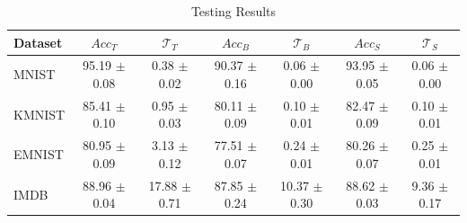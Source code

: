 \begin{table}
	\centering
	\caption{Testing Results}
	\label{tab:test-table-dkd}
	\begin{tabular}{lcccccc}
		\hline
		Dataset & $Acc_T$ & $\mathcal{T}_T$ & $Acc_B$ & $\mathcal{T}_B$ & $Acc_S$ & $\mathcal{T}_S$ \\
		\hline
		MNIST & 95.19 \newline $\pm$ 0.08 & 0.38 \newline $\pm$ 0.02 & 90.37 \newline $\pm$ 0.16 & 0.06 \newline $\pm$ 0.00 & 93.95 \newline $\pm$ 0.05 & 0.06 \newline $\pm$ 0.00 \\
		KMNIST & 85.41 \newline $\pm$ 0.10 & 0.95 \newline $\pm$ 0.03 & 80.11 \newline $\pm$ 0.09 & 0.10 \newline $\pm$ 0.01 & 82.47 \newline $\pm$ 0.09 & 0.10 \newline $\pm$ 0.01 \\
		EMNIST & 80.95 \newline $\pm$ 0.09 & 3.13 \newline $\pm$ 0.12 & 77.51 \newline $\pm$ 0.07 & 0.24 \newline $\pm$ 0.01 & 80.26 \newline $\pm$ 0.07 & 0.25 \newline $\pm$ 0.01 \\
		IMDB & 88.96 \newline $\pm$ 0.04 & 17.88 \newline $\pm$ 0.71 & 87.85 \newline $\pm$ 0.24 & 10.37 \newline $\pm$ 0.30 & 88.62 \newline $\pm$ 0.03 & 9.36 \newline $\pm$ 0.17 \\
		\hline
	\end{tabular}
\end{table}